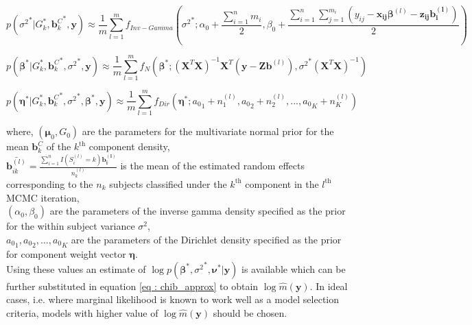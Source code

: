 \begin{equation}
p({\sigma^2}^*|G_k^*, {\boldsymbol{b}_k^C}^*, \boldsymbol{y}) \approx 
\frac 1 m \sum_{l=1}^m f_{Inv-Gamma}({\sigma^2}^*; \alpha_0 + \frac {\sum_{i=1}^n m_i} 2, 
\beta_0 + \frac {\sum_{i=1}^n \sum_{j=1}^{m_i} (y_{ij} - \boldsymbol{x_{ij}}\boldsymbol{\beta}^{(l)} - \boldsymbol{z_{ij}}\boldsymbol{b_i^{(l)}})} 2)
\end{equation}

\begin{equation}
p({\boldsymbol{\beta}}^*|G_k^*, {\boldsymbol{b}_k^C}^*, {\sigma^2}^*, \boldsymbol{y}) \approx 
\frac 1 m \sum_{l=1}^m f_N({\boldsymbol{\beta}}^*; (\boldsymbol{X}^T\boldsymbol{X})^{-1}\boldsymbol{X}^T(\boldsymbol{y} - {\boldsymbol{Zb}}^{(l)}), {\sigma^2}^*(\boldsymbol{X}^T\boldsymbol{X})^{-1})
\end{equation}

\begin{equation}
p({\boldsymbol{\eta}}^*|G_k^*, {\boldsymbol{b}_k^C}^*, {\sigma^2}^*,{\boldsymbol{\beta}}^*, \boldsymbol{y}) \approx 
\frac 1 m \sum_{l=1}^m f_{Dir}({\boldsymbol{\eta}}^*; {a_0}_1 + n_1^{(l)}, {a_0}_2 + n_2^{(l)}, ..., {a_0}_K + n_K^{(l)})
\end{equation}

where, 
$(\boldsymbol{\mu}_0, G_0)$ are the parameters for the multivariate normal prior for the mean $\boldsymbol{b}_k^C$ of the $k^\text{th}$ component density,\\
$\bar{\boldsymbol{b}_{ik}^{(l)}} = \frac {\sum_{i=1}^n I(S_i^{(l)}=k) \boldsymbol{b_i^{(l)}}} {n_k^{(l)}}$ is the mean of the estimated random effects corresponding to the $n_k$ subjects classified under the $k^\text{th}$ component in the $l^\text{th}$ MCMC iteration,\\
$(\alpha_0, \beta_0)$ are the parameters of the inverse gamma density specified as the prior for the within subject variance $\sigma^2$,\\
${a_0}_1, {a_0}_2,..., {a_0}_K$ are the parameters of the Dirichlet density specified as the prior for component weight vector $\boldsymbol{\eta}$.\\

Using these values an estimate of $\log{p({\boldsymbol{\beta}}^*, {\sigma^2}^*, \boldsymbol{\nu}^*|\boldsymbol{y})}$ is available which can be further substituted in equation \ref{eq : chib_approx} to obtain $\log{\hat{m}(\boldsymbol{y})}$. In ideal cases, i.e. where marginal likelihood is known to work well as a model selection criteria, models with higher value of $\log{\hat{m}(\boldsymbol{y})}$ should be chosen.


